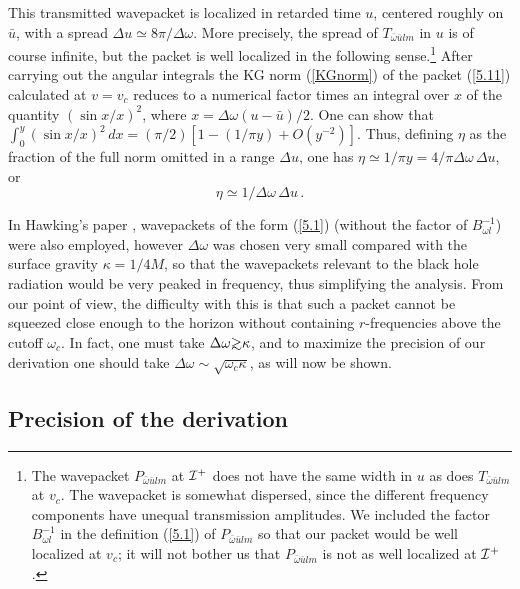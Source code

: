 \documentclass[12pt]{article}
\def\gtwid{\raise.3ex\hbox{$>$\kern-.75em\lower1ex\hbox{$\sim$}}}
\def\o{\omega}
\def\obar{\bar{\omega}}
\def\ubar{\bar{u}}
\def\futI{{\cal I}^+}
\begin{document}
This transmitted wavepacket is localized in retarded time
$u$, centered roughly on $\ubar$, with a spread
$\Delta u\simeq 8\pi/\Delta\o$. More precisely,
the spread of $T_{\obar\ubar lm}$ in $u$ is
of course infinite, but the packet is well localized in the
following sense.\footnote{The wavepacket
$P_{\obar\ubar lm}$ at $\futI$
does not have the same width in $u$ as does
$T_{\obar\ubar lm}$ at $v_c$. The wavepacket is somewhat
dispersed, since the different frequency
components have unequal transmission amplitudes.
We included the factor $B_{\o l}^{-1}$ in the
definition (\ref{5.1}) of $P_{\obar\ubar lm}$ so that
our packet would be well localized at $v_c$; it will not
bother us that $P_{\obar\ubar lm}$ is not as well localized
at $\futI$.}
After carrying out the
angular integrals the KG norm (\ref{KGnorm}) of the packet
(\ref{5.11})
calculated at $v=v_c$ reduces to a numerical factor times an
integral over $x$ of the quantity $(\sin x/x)^2$, where
$x=\Delta\o(u-\ubar)/2$.
One can show that
$\int_0^y(\sin x/x)^2\, dx=(\pi/2)[1-(1/\pi y)+O(y^{-2})]$.
Thus, defining $\eta$ as the fraction of the full norm omitted in a
range $\Delta u$, one
has $\eta\simeq 1/\pi y = 4/\pi \Delta\omega\, \Delta u$, or
\begin{equation}
\eta\simeq 1/\Delta\omega\, \Delta u\, .
\label{eq:eta}
\end{equation}

In Hawking's paper \cite{Hawk75}, wavepackets of the
form (\ref{5.1}) (without the factor of $B_{\o l}^{-1}$)
were also employed, however
$\Delta\o$ was chosen very small compared with
the surface gravity $\kappa=1/4M$, so that the wavepackets
relevant to the black hole radiation would be very peaked
in frequency, thus simplifying the analysis. From our point
of view, the difficulty with this is that
such a packet cannot be squeezed close enough to the horizon
without containing $r$-frequencies above the cutoff $\o_c$.
In fact, one must take $\Delta\o\gtwid \kappa$, and to maximize
the precision of our derivation one should take
$\Delta\o\sim \sqrt{\o_c\kappa}$, as will now be shown.

\subsection{Precision of the derivation}
\label{subsec:precision}
\end{document}

